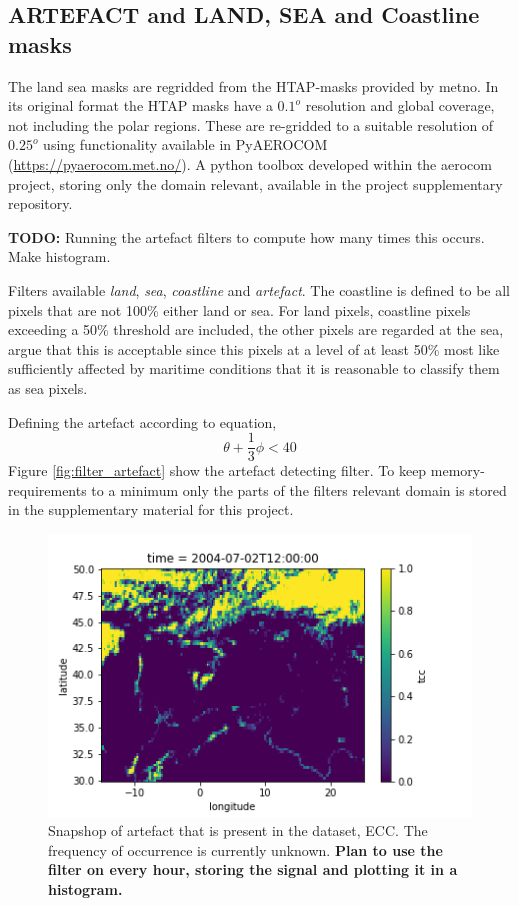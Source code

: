 \subsection{ARTEFACT and LAND, SEA and Coastline masks} \label{sec:artefact}
The land sea masks are regridded from the HTAP-masks provided by \acrfull{metno}.  In its original format the HTAP masks have a $0.1^o$ resolution and global coverage, not including the polar regions. These are re-gridded to a suitable resolution of $0.25^o$ using functionality available in PyAEROCOM (\href{https://pyaerocom.met.no/}{https://pyaerocom.met.no/}). A python toolbox developed within the \acrfull{aerocom} project, storing only the domain relevant, available in the project supplementary repository. 

\textbf{TODO:} Running the artefact filters to compute how many times this occurs. Make histogram.

Filters available \textit{land}, \textit{sea}, \textit{coastline} and \textit{artefact}. The coastline is defined to be all pixels that are not 100\% either land or sea. For land pixels, coastline pixels exceeding a 50\% threshold are included, the other pixels are regarded at the sea, argue that this is acceptable since this pixels at a level of at least 50\% most like sufficiently affected by maritime conditions that it is reasonable to classify them as sea pixels.

Defining the artefact according to equation, 
\begin{equation} \label{eq:artefact}
    \theta + \frac{1}{3}\phi < 40
\end{equation}
Figure \ref{fig:filter_artefact} show the artefact detecting filter. To keep memory-requirements to a minimum only the parts of the filters relevant domain is stored in the supplementary material for this project.

\begin{figure}
    \centering
    \includegraphics{Chapter4_Results/figurs/example_artefact.png}
    \caption[Artefact in European Cloud Cover dataset.]{Snapshop of artefact that is present in the dataset, ECC. The frequency of occurrence is currently unknown. \textbf{Plan to use the filter on every hour, storing the signal and plotting it in a histogram.}}
    \label{fig:example_artefact}
\end{figure}

